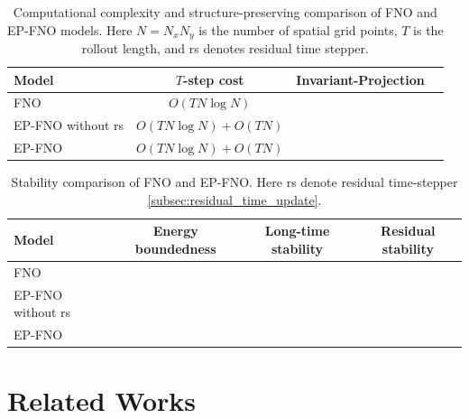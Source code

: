 \documentclass[11pt,a4paper]{article}
\newcommand{\cmark}{\textcolor{green!60!black}{\ding{51}}}
\newcommand{\xmark}{\textcolor{red!75!black}{\ding{55}}}
\theoremstyle{definition}
\theoremstyle{remark}
\numberwithin{equation}{section}
\numberwithin{figure}{section}
\numberwithin{table}{section}
\begin{document}
\begin{table}[htbp]
\centering
\caption{Computational complexity and structure-preserving comparison of FNO and EP-FNO models.
Here \(N=N_xN_y\) is the number of spatial grid points, \(T\) is the rollout length, and rs denotes residual time stepper.}
\label{tab:fno_epfno_complexity_structure}
\begin{tabular}{lccc}
\hline
\textbf{Model} 
& \textbf{\(T\)-step cost} 
& \textbf{Invariant-Projection} \\
\hline
FNO 
& \(O(TN\log N)\) 
& \xmark  \\

EP-FNO without rs
& \(O(TN\log N)+O(TN)\) 
& \cmark \\

EP-FNO 
& \(O(TN\log N)+O(TN)\) 
& \cmark \\
\hline
\end{tabular}

\vspace{0.5em}
\begin{minipage}{0.92\textwidth}
\end{minipage}
\end{table}
\begin{table}[htbp]
\centering
\caption{Stability comparison of FNO and EP-FNO. Here rs denote residual time-stepper \eqref{subsec:residual_time_update}.}
\label{tab:stability_fno_epfno}
\begin{tabular}{lccc}
\hline
\textbf{Model}
& \textbf{Energy boundedness}
& \textbf{Long-time stability}
& \textbf{Residual stability} \\
\hline

FNO
& \xmark
& \xmark
& \xmark \\

EP-FNO without rs
& \cmark
& \cmark
& \xmark \\

EP-FNO
& \cmark
& \cmark
& \cmark \\

\hline
\end{tabular}

\vspace{0.5em}
\begin{minipage}{0.88\textwidth}
\end{minipage}
\end{table}

\section{Related Works}\label{sec:relwork}
\end{document}
